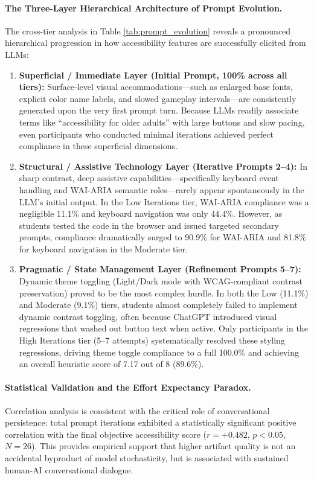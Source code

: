 \documentclass{cleiej}
\begin{document}
\paragraph{The Three-Layer Hierarchical Architecture of Prompt Evolution.}
The cross-tier analysis in Table \ref{tab:prompt_evolution} reveals a pronounced hierarchical progression in how accessibility features are successfully elicited from LLMs:
\begin{enumerate}[label=\textbf{Layer \arabic*:}, leftmargin=*]
    \item \textbf{Superficial / Immediate Layer (Initial Prompt, 100\% across all tiers):} Surface-level visual accommodations---such as enlarged base fonts, explicit color name labels, and slowed gameplay intervals---are consistently generated upon the very first prompt turn. Because LLMs readily associate terms like ``accessibility for older adults'' with large buttons and slow pacing, even participants who conducted minimal iterations achieved perfect compliance in these superficial dimensions.
    \item \textbf{Structural / Assistive Technology Layer (Iterative Prompts 2--4):} In sharp contrast, deep assistive capabilities---specifically keyboard event handling and WAI-ARIA semantic roles---rarely appear spontaneously in the LLM's initial output. In the Low Iterations tier, WAI-ARIA compliance was a negligible 11.1\% and keyboard navigation was only 44.4\%. However, as students tested the code in the browser and issued targeted secondary prompts, compliance dramatically surged to 90.9\% for WAI-ARIA and 81.8\% for keyboard navigation in the Moderate tier.
    \item \textbf{Pragmatic / State Management Layer (Refinement Prompts 5--7):} Dynamic theme toggling (Light/Dark mode with WCAG-compliant contrast preservation) proved to be the most complex hurdle. In both the Low (11.1\%) and Moderate (9.1\%) tiers, students almost completely failed to implement dynamic contrast toggling, often because ChatGPT introduced visual regressions that washed out button text when active. Only participants in the High Iterations tier (5--7 attempts) systematically resolved these styling regressions, driving theme toggle compliance to a full 100.0\% and achieving an overall heuristic score of 7.17 out of 8 (89.6\%).
\end{enumerate}

\paragraph{Statistical Validation and the Effort Expectancy Paradox.}
Correlation analysis is consistent with the critical role of conversational persistence: total prompt iterations exhibited a statistically significant positive correlation with the final objective accessibility score ($r = +0.482$, $p < 0.05$, $N = 26$). This provides empirical support that higher artifact quality is not an accidental byproduct of model stochasticity, but is associated with sustained human-AI conversational dialogue.
\end{document}

